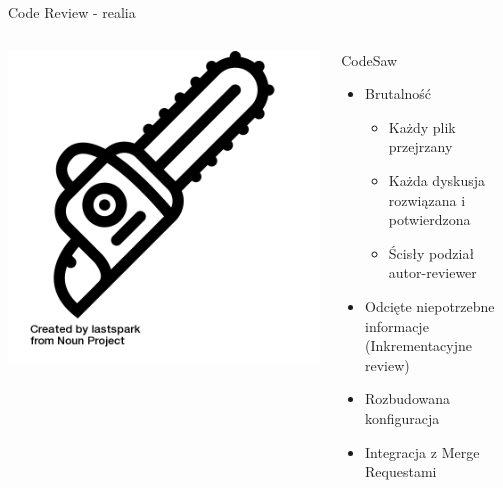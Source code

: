 \documentclass[ignorenonframetext]{beamer}
\begin{document}
\begin{frame}{Code Review - realia}

	\begin{columns}
	
	\begin{column}{0.3\textwidth}
		\centering
		\includegraphics[scale=0.17]{images/chainsaw.png}
	\end{column}
	\begin{column}{0.7\textwidth}

		\LARGE
		CodeSaw
		\normalsize

		\begin{itemize}
			\item Brutalność
				\begin{itemize}
					\item Każdy plik przejrzany
					\item Każda dyskusja rozwiązana i potwierdzona
					\item Ścisły podział autor-reviewer
				\end{itemize}
			\item Odcięte niepotrzebne informacje (Inkrementacyjne review)
			\item Rozbudowana konfiguracja
			\item Integracja z Merge Requestami
		\end{itemize}
	\end{column}
\end{columns}
\end{frame}
\end{document}
